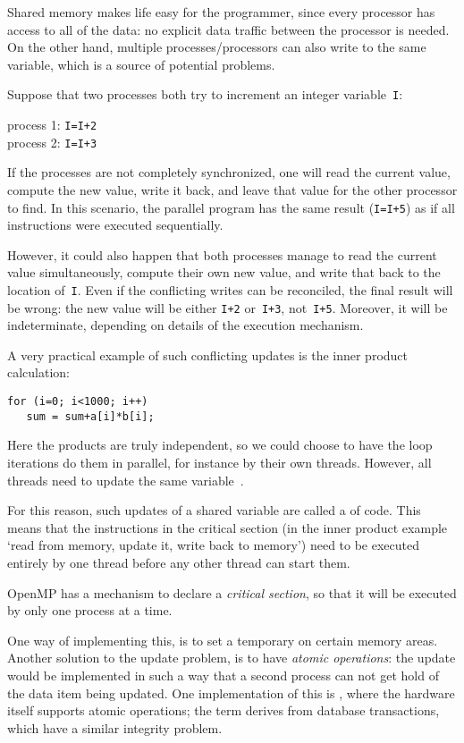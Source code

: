 Shared memory makes life easy for the programmer, since every
processor has access to all of the data: no explicit data traffic
between the processor is needed. On the other hand, multiple
processes/processors can also write to the same variable, which is a
source of potential problems.

Suppose that two processes both try to increment an integer
variable~\texttt{I}:
\begin{tabbing}
  process 1: \texttt{I=I+2}\\
  process 2: \texttt{I=I+3}
\end{tabbing}
If the processes are not completely synchronized, one will read the
current value, compute the new value, write it back, and leave that
value for the other processor to find. In this scenario, the parallel
program has the same result (\texttt{I=I+5}) as if all instructions
were executed sequentially.

However, it could also happen that both processes manage to read the
current value simultaneously, compute their own new value, and write that
back to the location of~\texttt{I}. Even if the conflicting writes can
be reconciled, the final result will be wrong: the new value will be
either \texttt{I+2} or~\texttt{I+3}, not~\texttt{I+5}. Moreover, it
will be indeterminate, depending on details of the execution
mechanism.

A very practical example of such conflicting updates is the inner
product calculation:
\begin{verbatim}
for (i=0; i<1000; i++)
   sum = sum+a[i]*b[i];
\end{verbatim}
Here the products are truly independent, so we could choose to have
the loop iterations do them in parallel, for instance by their own
threads. However, all threads need to update the same variable~.

For this reason, such updates of a shared variable are called a
 of code. This means that the instructions
in the critical section (in the inner product example `read 
from memory, update it, write back to memory') need to be executed
entirely by one thread before any other thread can start them.

OpenMP has a mechanism to
declare a \emph{critical section}, so that it will be executed by only one
process at a time. 

One way of implementing this, is to set a
temporary  on certain memory areas. Another solution
to the update problem, is to have \emph{atomic operations}: the
update would be implemented in such a way that a second process can
not get hold of the data item being updated. One implementation of
this is , where the hardware itself
supports atomic operations; the term derives from database
transactions, which have a similar integrity problem.

